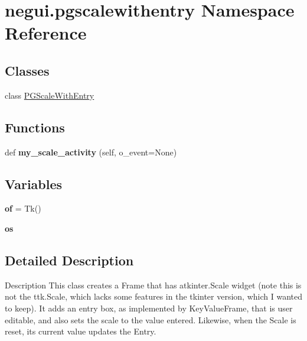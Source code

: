 \hypertarget{namespacenegui_1_1pgscalewithentry}{}\section{negui.\+pgscalewithentry Namespace Reference}
\label{namespacenegui_1_1pgscalewithentry}
\subsection*{Classes}
\begin{DoxyCompactItemize}
\item 
class \hyperlink{classnegui_1_1pgscalewithentry_1_1PGScaleWithEntry}{P\+G\+Scale\+With\+Entry}
\end{DoxyCompactItemize}
\subsection*{Functions}
\begin{DoxyCompactItemize}
\item 
def {\bfseries my\+\_\+scale\+\_\+activity} (self, o\+\_\+event=None)\hypertarget{namespacenegui_1_1pgscalewithentry_af90e0d6c5ca61d57bc325e76c5573e2a}{}\label{namespacenegui_1_1pgscalewithentry_af90e0d6c5ca61d57bc325e76c5573e2a}

\end{DoxyCompactItemize}
\subsection*{Variables}
\begin{DoxyCompactItemize}
\item 
{\bfseries of} = Tk()\hypertarget{namespacenegui_1_1pgscalewithentry_ab5953038a7003f6d0254a2612fd2ec47}{}\label{namespacenegui_1_1pgscalewithentry_ab5953038a7003f6d0254a2612fd2ec47}

\item 
{\bfseries os}
\end{DoxyCompactItemize}


\subsection{Detailed Description}
\begin{DoxyVerb}Description
This class creates a Frame that has atkinter.Scale widget (note
this is not the ttk.Scale, which lacks some features
in the tkinter version, which I wanted to keep).  It
adds an entry box, as implemented by KeyValueFrame, 
that is user editable, and also sets the scale to 
the value entered.  Likewise, when the Scale is reset,
its current value updates the Entry.
\end{DoxyVerb}
 

